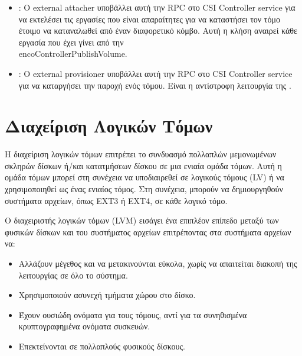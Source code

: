 \begin{itemize}
      \item{}: Ο external attacher υποβάλλει αυτή
            την RPC στο CSI Controller service για να εκτελέσει τις εργασίες που
            είναι απαραίτητες για να καταστήσει τον τόμο έτοιμο να
            καταναλωθεί από έναν διαφορετικό κόμβο. Αυτή η κλήση αναιρεί κάθε
            εργασία που έχει γίνει από την \\en{co{ControllerPublishVolume}}.

      \item{}: Ο  external provisioner υποβάλλει αυτή την RPC στο
            CSI Controller service για να καταργήσει την παροχή ενός τόμου.
            Είναι η αντίστροφη λειτουργία της .

\end{itemize}

\section{Διαχείριση Λογικών Τόμων}

Η διαχείριση λογικών τόμων επιτρέπει το συνδυασμό πολλαπλών μεμονωμένων σκληρών
δίσκων ή/και κατατμήσεων δίσκου σε μια ενιαία ομάδα τόμων. Αυτή η ομάδα τόμων
μπορεί στη συνέχεια να υποδιαιρεθεί σε λογικούς τόμους (LV) ή να χρησιμοποιηθεί
ως ένας ενιαίος τόμος. Στη συνέχεια, μπορούν να δημιουργηθούν συστήματα αρχείων,
όπως EXT3 ή EXT4, σε κάθε λογικό τόμο.


Ο διαχειριστής λογικών τόμων (LVM) εισάγει ένα επιπλέον επίπεδο μεταξύ των
φυσικών δίσκων και του συστήματος αρχείων επιτρέποντας στα συστήματα αρχείων να:
\begin{itemize}
      \tightlist
      \item
            Αλλάζουν μέγεθος και να μετακινούνται εύκολα, χωρίς να απαιτείται
            διακοπή της λειτουργίας σε όλο το σύστημα.
      \item
            Χρησιμοποιούν ασυνεχή τμήματα χώρου στο δίσκο.
      \item
            Έχουν ουσιώδη ονόματα για τους τόμους, αντί για τα συνηθισμένα
            κρυπτογραφημένα ονόματα συσκευών.
      \item
            Επεκτείνονται σε πολλαπλούς φυσικούς δίσκους.
\end{itemize}


